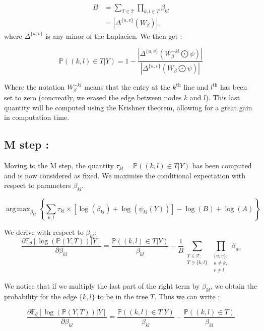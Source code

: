 \documentclass[a4paper,10pt]{article}
\DeclareMathOperator*{\argmax}{arg\,max}
\begin{document}
\begin{align*}
B &= \sum_{T \in \mathcal{T}} \prod_{k,l\in T} \beta_{kl}\\
 &=|\Delta^{\{u,v\}}(W_{\beta})|,
\end{align*}
where $\Delta^{\{u,v\}}$ is any minor of the Laplacien. We then get :

\[ \mathds{P}((k,l)\in T | Y) =1-\frac{|\Delta^{\{u,v\}}(W_{\beta}^{-kl}\bigodot\psi)|}{|\Delta^{\{u,v\}}(W_{\beta}\bigodot\psi)|}\]

Where the notation $W_{\beta}^{-kl}$ means that the entry at the $k^{\text{th}}$ line and $l^{\text{th}}$ has been set to zero
(concreatly, we erased the edge between nodes $k$ and $l$). This last quantity will be computed using the Krishner theorem, allowing for a great gain in computation time.


\subsection{M step :\\}
Moving to the M step, the quantity $\tau_{kl} = \mathds{P}((k,l)\in T | Y)$ has been computed and is now considered as fixed.
We maximise the conditional expectation with respect to parameters $\beta_{kl}$.

\[\argmax_{\beta_{kl}} \left\{\sum_{k,l} \tau_{kl}\times \left[ \log(\beta_{kl}) + \log(\psi_{kl}(Y)) \right]
 -\log(B)+\log(A)\right\}\]

 We derive with respect to $\beta_{kl}$:
 \[\frac{\partial\mathds{E}_\theta[\log(\mathds{P}(Y,T))|Y]}{\partial\beta_{kl}} =\frac{ \mathds{P}((k,l)\in T | Y)}{\beta_{kl}} - \frac{1}{B}
 \sum_{\substack{T\in \mathcal{T}:\\T \ni \{k,l\}}} \prod_{\substack{\{u,v\} :\\ u \ne k,\\v\ne l}} \beta_{uv}\]

 We notice that if we multiply the last part of the right term by $\beta_{kl}$, we obtain the probability for the edge $\{k,l\}$ to be in the tree $T$.
Thus we can write :

 \begin{equation}
 \label{1}
 \frac{\partial\mathds{E}_\theta[\log(\mathds{P}(Y,T))|Y]}{\partial\beta_{kl}} =\frac{ \mathds{P}((k,l)\in T | Y)}{\beta_{kl}} 
 -\frac{\mathds{P}((k,l)\in T)}{\beta_{kl}}  
 \end{equation}
\end{document}
